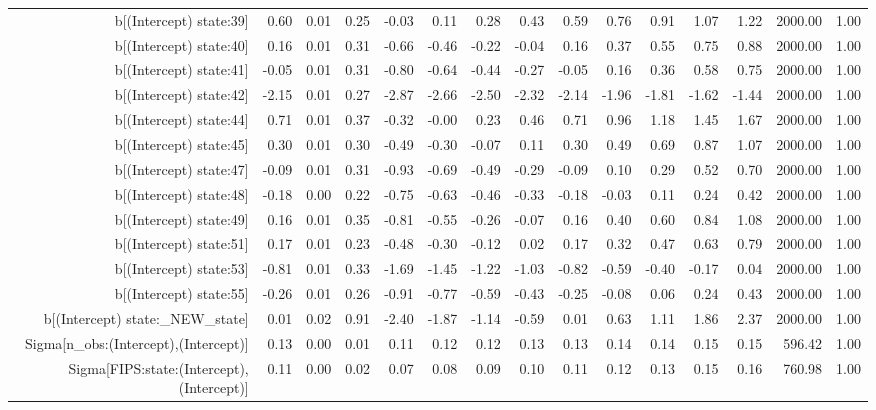 \begin{table}[ht]
\begin{tabular}{rrrrrrrrrrrrrrr}
  b[(Intercept) state:39] & 0.60 & 0.01 & 0.25 & -0.03 & 0.11 & 0.28 & 0.43 & 0.59 & 0.76 & 0.91 & 1.07 & 1.22 & 2000.00 & 1.00 \\ 
  b[(Intercept) state:40] & 0.16 & 0.01 & 0.31 & -0.66 & -0.46 & -0.22 & -0.04 & 0.16 & 0.37 & 0.55 & 0.75 & 0.88 & 2000.00 & 1.00 \\ 
  b[(Intercept) state:41] & -0.05 & 0.01 & 0.31 & -0.80 & -0.64 & -0.44 & -0.27 & -0.05 & 0.16 & 0.36 & 0.58 & 0.75 & 2000.00 & 1.00 \\ 
  b[(Intercept) state:42] & -2.15 & 0.01 & 0.27 & -2.87 & -2.66 & -2.50 & -2.32 & -2.14 & -1.96 & -1.81 & -1.62 & -1.44 & 2000.00 & 1.00 \\ 
  b[(Intercept) state:44] & 0.71 & 0.01 & 0.37 & -0.32 & -0.00 & 0.23 & 0.46 & 0.71 & 0.96 & 1.18 & 1.45 & 1.67 & 2000.00 & 1.00 \\ 
  b[(Intercept) state:45] & 0.30 & 0.01 & 0.30 & -0.49 & -0.30 & -0.07 & 0.11 & 0.30 & 0.49 & 0.69 & 0.87 & 1.07 & 2000.00 & 1.00 \\ 
  b[(Intercept) state:47] & -0.09 & 0.01 & 0.31 & -0.93 & -0.69 & -0.49 & -0.29 & -0.09 & 0.10 & 0.29 & 0.52 & 0.70 & 2000.00 & 1.00 \\ 
  b[(Intercept) state:48] & -0.18 & 0.00 & 0.22 & -0.75 & -0.63 & -0.46 & -0.33 & -0.18 & -0.03 & 0.11 & 0.24 & 0.42 & 2000.00 & 1.00 \\ 
  b[(Intercept) state:49] & 0.16 & 0.01 & 0.35 & -0.81 & -0.55 & -0.26 & -0.07 & 0.16 & 0.40 & 0.60 & 0.84 & 1.08 & 2000.00 & 1.00 \\ 
  b[(Intercept) state:51] & 0.17 & 0.01 & 0.23 & -0.48 & -0.30 & -0.12 & 0.02 & 0.17 & 0.32 & 0.47 & 0.63 & 0.79 & 2000.00 & 1.00 \\ 
  b[(Intercept) state:53] & -0.81 & 0.01 & 0.33 & -1.69 & -1.45 & -1.22 & -1.03 & -0.82 & -0.59 & -0.40 & -0.17 & 0.04 & 2000.00 & 1.00 \\ 
  b[(Intercept) state:55] & -0.26 & 0.01 & 0.26 & -0.91 & -0.77 & -0.59 & -0.43 & -0.25 & -0.08 & 0.06 & 0.24 & 0.43 & 2000.00 & 1.00 \\ 
  b[(Intercept) state:\_NEW\_state] & 0.01 & 0.02 & 0.91 & -2.40 & -1.87 & -1.14 & -0.59 & 0.01 & 0.63 & 1.11 & 1.86 & 2.37 & 2000.00 & 1.00 \\ 
  Sigma[n\_obs:(Intercept),(Intercept)] & 0.13 & 0.00 & 0.01 & 0.11 & 0.12 & 0.12 & 0.13 & 0.13 & 0.14 & 0.14 & 0.15 & 0.15 & 596.42 & 1.00 \\ 
  Sigma[FIPS:state:(Intercept),(Intercept)] & 0.11 & 0.00 & 0.02 & 0.07 & 0.08 & 0.09 & 0.10 & 0.11 & 0.12 & 0.13 & 0.15 & 0.16 & 760.98 & 1.00 \\ 

\end{tabular}
\end{table}
